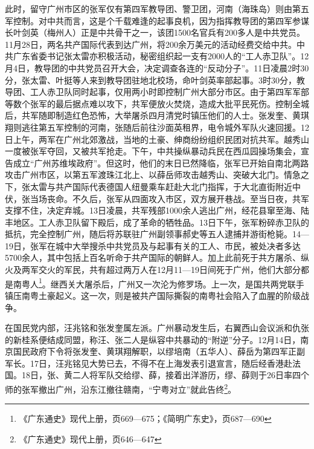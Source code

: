 此时，留守广州市区的张军仅有第四军教导团、警卫团，河南（海珠岛）则由第五军控制。对中共而言，这是个千载难逢的起事良机，因为指挥教导团的第四军参谋长叶剑英（梅州人）正是中共骨干之一，该团1500名官兵有200多人是中共党员。11月28日，两名共产国际代表到达广州，将200余万美元的活动经费交给中共。中共广东省委书记张太雷亦积极活动，秘密组织起一支有2000人的“工人赤卫队”。12月4日，教导团的中共党员召开大会，决定调查各连的“反动分子”。11日凌晨2时30分，张太雷、叶挺等人来到教导团驻地北校场，命叶剑英率部起事。3时30分，教导团、工人赤卫队同时起事，仅用两小时即控制广州大部分市区。由于第四军军部等数个张军的最后据点难以攻下，共军便放火焚烧，造成大批平民死伤。控制全城后，共军随即制造红色恐怖，大举屠杀四月清党时镇压他们的人士。张发奎、黄琪翔则逃往第五军控制的河南，张随后前往沙面英租界，电令城外军队火速回援。12日上午，两军在广州北郊激战，当地的土豪、绅商纷纷组织民团对抗共军。越秀山一度被张军夺回，又被共军抢走。下午，中共操纵暴动兵民在西瓜园操场集会，宣告成立“广州苏维埃政府”。但这时，他们的末日已然降临，张军已开始自南北两路攻击广州市区，以第五军渡珠江北上、以薛岳师攻击越秀山、突破大北门。情急之下，张太雷与共产国际代表德国人纽曼乘车赶赴大北门指挥，于大北直街附近中伏，张当场丧命。不久后，张军从四面攻入市区，双方展开巷战。至当日夜，共军支撑不住，决定弃城。13日凌晨，共军残部1000余人逃出广州，经花县窜至海、陆丰地区。工人赤卫队留下殿后，成了革命的牺牲品。13日下午，张军粉碎赤卫队的抵抗，完全控制广州，随后将苏联驻广州副领事郝史等五人逮捕并游街枪毙。14—19日，张军在城中大举搜杀中共党员及与起事有关的工人、市民，被处决者多达5700余人，其中包括上百名听命于共产国际的朝鲜人。加上此前死于共方屠杀、纵火及两军交火的军民，共有超过两万人在12月11—19日间死于广州，他们大部分都是南粤人\footnote{《广东通史》现代上册，页669—675；《简明广东史》，页687—690}。继西关大屠杀后，广州又一次沦为修罗场。上一次，是国共两党联手镇压南粤土豪起义。这一次，则是被共产国际撕裂的南粤社会陷入了血腥的阶级战争。

在国民党内部，汪兆铭和张发奎属左派。广州暴动发生后，右翼西山会议派和仇张的新桂系便结成同盟，称汪、张二人是纵容中共暴动的“附逆”分子。12月14日，南京国民政府下令将张发奎、黄琪翔解职，以缪培南（五华人）、薛岳为第四军正副军长。17日，汪兆铭见大势已去，不得不在上海发表引退宣言，随后经香港赴法国。18日，张、黄二人将军队交给缪、薛，接着出洋游历，缪、薛则于26日率四个师的张军撤出广州，沿东江撤往赣南，“宁粤对立”就此告终\footnote{《广东通史》现代上册，页646—647}。

